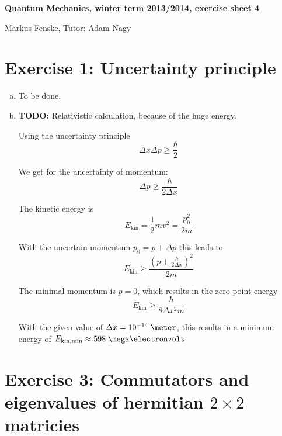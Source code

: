 \documentclass[a4paper,german,12pt,smallheadings]{scrartcl}
\begin{document}
\begin{center}
\bfseries %
\sffamily %
\vspace{-40pt}
Quantum Mechanics, winter term 2013/2014, exercise sheet 4

Markus Fenske, Tutor: Adam Nagy
\vspace{-10pt}
\end{center}

\section*{Exercise 1: Uncertainty principle}
\begin{enumerate}[a)]
  \item To be done.
  \item
    \textbf{TODO:} Relativistic calculation, because of the huge energy.

    Using the uncertainty principle
    \begin{equation*}
      \Delta x \Delta p \ge \frac{\hbar}{2}
    \end{equation*}

    We get for the uncertainty of momentum:
    \begin{equation*}
      \Delta p \ge \frac{\hbar}{2 \Delta x}
    \end{equation*}

    The kinetic energy is
    \begin{equation*}
      E_\text{kin} = \frac{1}{2} mv^2 = \frac{p_0^2}{2m}
    \end{equation*}

    With the uncertain momentum $p_0 = p + \Delta p$ this leads to
    \begin{equation*}
      E_\text{kin} \ge \frac{(p + \frac{\hbar}{2 \Delta x})^2}{2m}
    \end{equation*}

    The minimal momentum is $p=0$, which results in the zero point energy
    \begin{equation*}
      E_\text{kin} \ge \frac{\hbar}{8 \Delta x^2 m}
    \end{equation*}

    With the given value of $\Delta x = 10^{-14} \; \meter$, this results in a minimum energy of $E_\text{kin,min} \approx 598 \; \mega\electronvolt$
\end{enumerate}
\section*{Exercise 3: Commutators and eigenvalues of hermitian $2 \times 2$ matricies}
\end{document}
